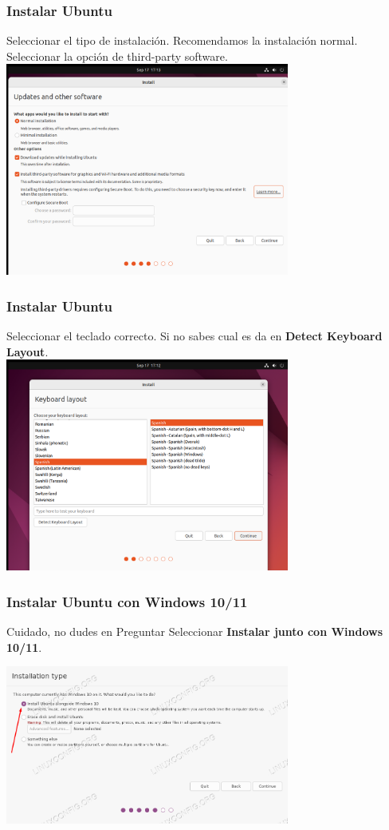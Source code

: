 \documentclass[10pt]{beamer}
\begin{document}
	\begin{frame}
		\frametitle{Instalar Ubuntu}
		Seleccionar el tipo de instalación. Recomendamos la instalación normal.\\
		Seleccionar la opción de third-party software.\\
		
		
		\includegraphics[width=0.7\textwidth]{installation}
	\end{frame}
	
	\begin{frame}
		\frametitle{Instalar Ubuntu}
		Seleccionar el teclado correcto. Si no sabes cual es da en \textbf{Detect Keyboard Layout}.\\
		
		
		\includegraphics[width=0.7\textwidth]{keyboard}
	\end{frame}
	
	\begin{frame}
		\frametitle{Instalar Ubuntu con Windows 10/11}
		\begin{alertblock}{Cuidado, no dudes en Preguntar}
			Seleccionar \textbf{Instalar junto con Windows 10/11}.
		\end{alertblock}
		
		\includegraphics[width=0.7\textwidth]{windows-10}
	\end{frame}
	
\end{document}

